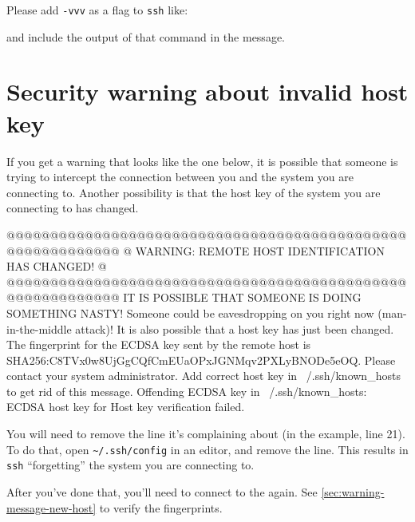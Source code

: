 \else
Please add \lstinline|-vvv| as a flag to \lstinline|ssh| like:

\begin{prompt}
\end{prompt}

and include the output of that command in the message.
\fi

\section{Security warning about invalid host key}
\label{sec:security-warning-invald-host-key}

If you get a warning that looks like the one below, it is possible
that someone is trying to intercept the connection between you and the system you are connecting to.
Another possibility is that the host key of the system you are connecting to has changed.

\ifmacORlinux

\begin{prompt}
@@@@@@@@@@@@@@@@@@@@@@@@@@@@@@@@@@@@@@@@@@@@@@@@@@@@@@@@@@@
@    WARNING: REMOTE HOST IDENTIFICATION HAS CHANGED!     @
@@@@@@@@@@@@@@@@@@@@@@@@@@@@@@@@@@@@@@@@@@@@@@@@@@@@@@@@@@@
IT IS POSSIBLE THAT SOMEONE IS DOING SOMETHING NASTY!
Someone could be eavesdropping on you right now (man-in-the-middle attack)!
It is also possible that a host key has just been changed.
The fingerprint for the ECDSA key sent by the remote host is
SHA256:C8TVx0w8UjGgCQfCmEUaOPxJGNMqv2PXLyBNODe5eOQ.
Please contact your system administrator.
Add correct host key in ~/.ssh/known_hosts to get rid of this message.
Offending ECDSA key in ~/.ssh/known_hosts:%
ECDSA host key for %
Host key verification failed.
\end{prompt}

You will need to remove the line it's complaining about (in the example, line 21).
To do that, open \lstinline|~/.ssh/config| in an editor, and remove the line. This
results in \lstinline|ssh| ``forgetting'' the system you are connecting to.

After you've done that, you'll need to connect to the \hpc again.
See \autoref{sec:warning-message-new-host} to verify the fingerprints.

\else

